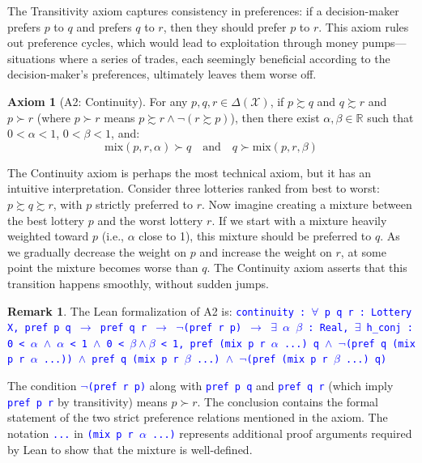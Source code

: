 \documentclass{article}
\theoremstyle{definition}
\newtheorem{remark}{Remark}[section]
\newtheorem{axiom}[definition]{Axiom}
\newcommand{\R}{\mathbb{R}}
\newcommand{\X}{\mathcal{X}}
\newcommand{\tactic}[1]{\textcolor{blue}{\texttt{#1}}}
\newcommand{\DeltaX}{\Delta(\X)} %
\newcommand{\pref}{\succsim} %
\newcommand{\strictpref}{\succ} %
\newcommand{\mix}{\mathrm{mix}} %
\begin{document}
The Transitivity axiom captures consistency in preferences: if a decision-maker prefers $p$ to $q$ and prefers $q$ to $r$, then they should prefer $p$ to $r$. This axiom rules out preference cycles, which would lead to exploitation through money pumps—situations where a series of trades, each seemingly beneficial according to the decision-maker's preferences, ultimately leaves them worse off.

\begin{axiom}[A2: Continuity]\label{ax:continuity}
For any $p, q, r \in \DeltaX$, if $p \pref q$ and $q \pref r$ and $p \strictpref r$ (where $p \strictpref r$ means $p \pref r \land \lnot(r \pref p)$), then there exist $\alpha, \beta \in \R$ such that $0 < \alpha < 1$, $0 < \beta < 1$, and:
\[ \mix(p, r, \alpha) \strictpref q \quad \text{and} \quad q \strictpref \mix(p, r, \beta) \]
\end{axiom}

The Continuity axiom is perhaps the most technical axiom, but it has an intuitive interpretation. Consider three lotteries ranked from best to worst: $p \pref q \pref r$, with $p$ strictly preferred to $r$. Now imagine creating a mixture between the best lottery $p$ and the worst lottery $r$. If we start with a mixture heavily weighted toward $p$ (i.e., $\alpha$ close to 1), this mixture should be preferred to $q$. As we gradually decrease the weight on $p$ and increase the weight on $r$, at some point the mixture becomes worse than $q$. The Continuity axiom asserts that this transition happens smoothly, without sudden jumps.

\begin{remark}
The Lean formalization of A2 is: \tactic{continuity : $\forall$ p q r : Lottery X, pref p q $\rightarrow$ pref q r $\rightarrow$ $\lnot$(pref r p) $\rightarrow$
  $\exists$ $\alpha$ $\beta$ : Real, $\exists$ h\_conj : 0 < $\alpha$ $\wedge$ $\alpha$ < 1 $\wedge$ 0 < $\beta\wedge\beta$ < 1,
  pref (mix p r $\alpha$ ...) q $\wedge$ $\lnot$(pref q (mix p r $\alpha$ ...)) $\wedge$
  pref q (mix p r $\beta$ ...) $\wedge$ $\lnot$(pref (mix p r $\beta$ ...) q)}

The condition \tactic{$\lnot$(pref r p)} along with \tactic{pref p q} and \tactic{pref q r} (which imply \tactic{pref p r} by transitivity) means $p \strictpref r$. The conclusion contains the formal statement of the two strict preference relations mentioned in the axiom. The notation \tactic{...} in \tactic{(mix p r $\alpha$ ...)} represents additional proof arguments required by Lean to show that the mixture is well-defined.
\end{remark}
\end{document}
